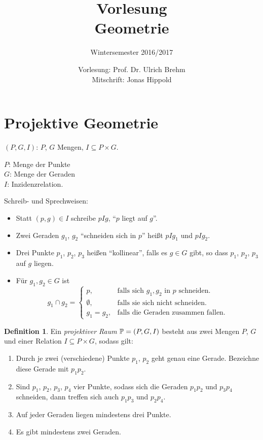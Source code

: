 \documentclass[
 a4paper,
 12pt,
 parskip=half
 ]{scrartcl}
\title{Vorlesung\\Geometrie}
\subtitle{Wintersemester 2016/2017}
\author{Vorlesung: Prof. Dr. Ulrich Brehm\\Mitschrift: Jonas Hippold}
\theoremstyle{plain}
\theoremstyle{definition}
\newtheorem*{defn*}{Definition}
\begin{document}
\maketitle

\tableofcontents

\setcounter{secnumdepth}{0}


\clearpage
\setcounter{secnumdepth}{1}


\clearpage
\section{Projektive Geometrie}
$(P,G,I)$: $P$, $G$ Mengen, $I \subseteq P \times G$.

$P$: Menge der Punkte \\
$G$: Menge der Geraden \\
$I$: Inzidenzrelation.

Schreib- und Sprechweisen:
\begin{itemize}
 \item Statt $(p,g) \in I$ schreibe $pIg$, ``$p$ liegt auf $g$''. 
 \item Zwei Geraden $g_1$, $g_2$ ``schneiden sich in $p$'' heißt $pIg_1$ und $pIg_2$. 
 \item Drei Punkte $p_1$, $p_2$, $p_3$ heißen ``kollinear'', falls es $g \in G$ gibt, so dass $p_1$, $p_2$, $p_3$ auf $g$ liegen.
 \item Für $g_1, g_2 \in G$ ist
  \[ g_1 \cap g_2 = \begin{cases}
                   p, &\text{falls sich } g_1, g_2 \text{ in } p \text{ schneiden.} \\
                   \emptyset, &\text{falls sie sich nicht schneiden.} \\
                   g_1 = g_2, &\text{falls die Geraden zusammen fallen.}
                  \end{cases} \]
\end{itemize}

\begin{defn*}
 Ein \emph{projektiver Raum} $\mathbb{P} = (P,G,I)$ besteht aus zwei Mengen $P$, $G$ und einer Relation $I \subseteq P \times G$, sodass gilt:
 \begin{enumerate}[{A}1)]
  \item Durch je zwei (verschiedene) Punkte $p_1$, $p_2$ geht genau eine Gerade. Bezeichne diese Gerade mit $p_1 p_2$.
  \item Sind $p_1$, $p_2$, $p_3$, $p_4$ vier Punkte, sodass sich die Geraden $p_1 p_2$ und $p_3 p_4$ schneiden, dann treffen sich auch $p_1 p_3$ und $p_2 p_4$.
  \item Auf jeder Geraden liegen mindestens drei Punkte.
  \item Es gibt mindestens zwei Geraden.
 \end{enumerate}
\end{defn*}
\end{document}
